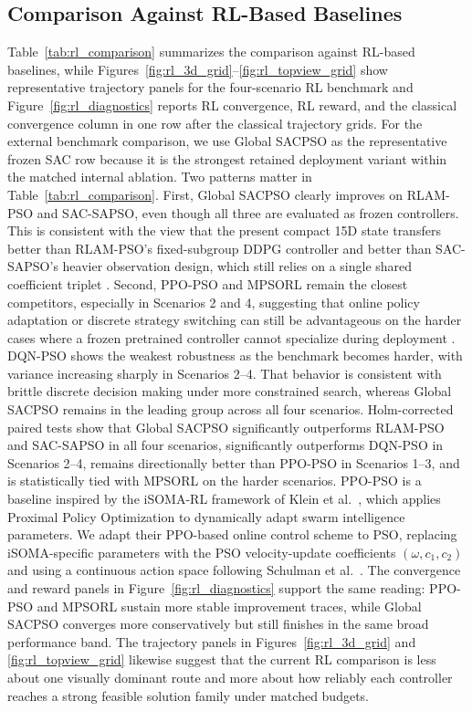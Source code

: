 \documentclass[final,5p,times]{elsarticle}
\begin{document}
\subsection{Comparison Against RL-Based Baselines}
Table~\ref{tab:rl_comparison} summarizes the comparison against RL-based baselines, while Figures~\ref{fig:rl_3d_grid}--\ref{fig:rl_topview_grid} show representative trajectory panels for the four-scenario RL benchmark and Figure~\ref{fig:rl_diagnostics} reports RL convergence, RL reward, and the classical convergence column in one row after the classical trajectory grids.
For the external benchmark comparison, we use Global SACPSO as the representative frozen SAC row because it is the strongest retained deployment variant within the matched internal ablation. Two patterns matter in Table~\ref{tab:rl_comparison}. First, Global SACPSO clearly improves on RLAM-PSO and SAC-SAPSO, even though all three are evaluated as frozen controllers. This is consistent with the view that the present compact 15D state transfers better than RLAM-PSO's fixed-subgroup DDPG controller and better than SAC-SAPSO's heavier observation design, which still relies on a single shared coefficient triplet \cite{Yin2023RLAMPSO, vonEschwege2024Soft}. Second, PPO-PSO and MPSORL remain the closest competitors, especially in Scenarios 2 and 4, suggesting that online policy adaptation or discrete strategy switching can still be advantageous on the harder cases where a frozen pretrained controller cannot specialize during deployment \cite{Klein2024Optimizing, Meng2023Multistrategy}.
DQN-PSO shows the weakest robustness as the benchmark becomes harder, with variance increasing sharply in Scenarios 2--4. That behavior is consistent with brittle discrete decision making under more constrained search, whereas Global SACPSO remains in the leading group across all four scenarios. Holm-corrected paired tests show that Global SACPSO significantly outperforms RLAM-PSO and SAC-SAPSO in all four scenarios, significantly outperforms DQN-PSO in Scenarios 2--4, remains directionally better than PPO-PSO in Scenarios 1--3, and is statistically tied with MPSORL on the harder scenarios.
PPO-PSO is a baseline inspired by the iSOMA-RL framework of Klein et al.\ \cite{Klein2024Optimizing}, which applies Proximal Policy Optimization to dynamically adapt swarm intelligence parameters. We adapt their PPO-based online control scheme to PSO, replacing iSOMA-specific parameters with the PSO velocity-update coefficients $(\omega, c_1, c_2)$ and using a continuous action space following Schulman et al.\ \cite{Schulman2017Proximal}. The convergence and reward panels in Figure~\ref{fig:rl_diagnostics} support the same reading: PPO-PSO and MPSORL sustain more stable improvement traces, while Global SACPSO converges more conservatively but still finishes in the same broad performance band. The trajectory panels in Figures~\ref{fig:rl_3d_grid} and \ref{fig:rl_topview_grid} likewise suggest that the current RL comparison is less about one visually dominant route and more about how reliably each controller reaches a strong feasible solution family under matched budgets.
\end{document}
